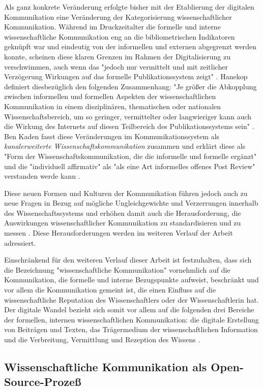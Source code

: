 Als ganz konkrete Veränderung erfolgte bisher mit der Etablierung der digitalen Kommunikation eine Veränderung der Kategorisierung wissenschaftlicher Kommunikation. Während im Druckzeitalter die formelle und interne wissenschaftliche Kommunikation eng an die bibliometrischen Indikatoren geknüpft war und eindeutig von der informellen und externen abgegrenzt werden konnte, scheinen diese klaren Grenzen im Rahmen der Digitalisierung zu verschwimmen, auch wenn das "jedoch nur vermittelt und mit zeitlicher Verzögerung Wirkungen auf das formelle Publikationssystem zeigt" \cite{Hanekop_2014}. Hanekop definiert diesbezüglich den folgenden Zusammenhang: "Je größer die Abkopplung zwischen informellen und formellen Aspekten der wissenschaftlichen Kommunikation in einem disziplinären, thematischen oder nationalen Wissenschaftsbereich, um so geringer, vermittelter oder langwieriger kann auch die Wirkung des Internets auf diesen Teilbereich des Publikationssystems sein" \cite{Hanekop_2014}. Ben Kaden fasst diese Veränderungen im Kommunikationssystem als \textit{kanalerweiterte Wissenschaftskommunikation} zusammen und erklärt diese als "Form der Wissenschaftskommunikation, die die informelle und formelle ergänzt" und die "individuell affirmativ" als "als eine Art informelles offenes Post Review" verstanden werde kann \cite{kaden_2009_library}.

Diese neuen Formen und Kulturen der Kommunikation führen jedoch auch zu neue Fragen in Bezug auf mögliche Ungleichgewichte und Verzerrungen innerhalb des Wissenschaftssystems und erhöhen damit auch die Herausforderung, die Auswirkungen wissenschaftlicher Kommunikation zu standardisieren und zu messen \cite{gerber_2014_science}. Diese Herausforderungen werden im weiteren Verlauf der Arbeit adressiert.

Einschränkend für den weiteren Verlauf dieser Arbeit ist festzuhalten, dass sich die Bezeichnung "wissenschaftliche Kommunikation" vornehmlich auf die Kommunikation, die formelle und interne Bezugspunkte aufweist, beschränkt und vor allem die Kommunikation gemeint ist, die einen Einfluss auf die wissenschaftliche Reputation des Wissenschaftlers oder der Wissenschaftlerin hat. Der digitale Wandel bezieht sich somit vor allem auf die folgenden drei Bereiche der formellen, internen wissenschaftlichen Kommunikation: die digitale Erstellung von Beiträgen und Texten, das Trägermedium der wissenschaftlichen Information und die Verbreitung, Vermittlung und Rezeption des Wissens \cite{bbaw_publizieren_2015}.

\subsection{Wissenschaftliche Kommunikation als Open-Source-Prozeß}

